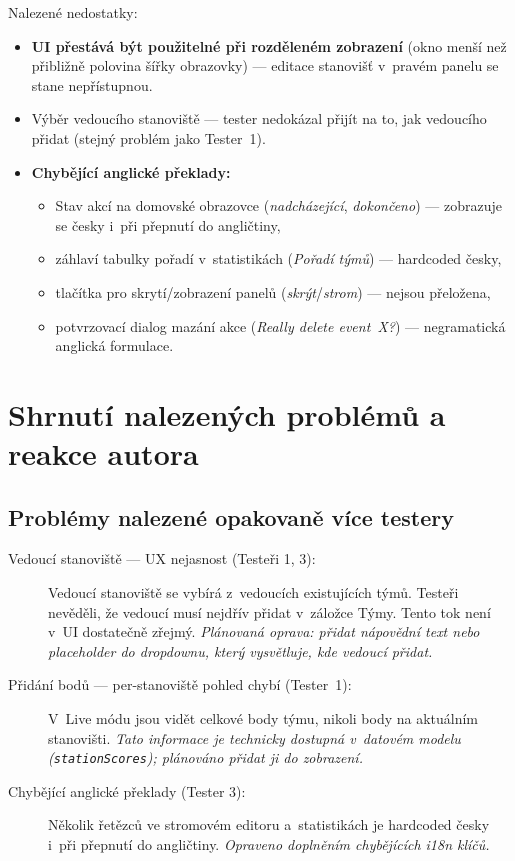 ﻿\documentclass[a4paper,12pt]{article}
\begin{document}
Nalezené nedostatky:

\begin{itemize}
  \item \textbf{UI přestává být použitelné při rozděleném zobrazení} (okno
    menší než přibližně polovina šířky obrazovky) — editace stanovišť
    v~pravém panelu se stane nepřístupnou.
  \item Výběr vedoucího stanoviště — tester nedokázal přijít na to, jak
    vedoucího přidat (stejný problém jako Tester~1).
  \item \textbf{Chybějící anglické překlady:}
    \begin{itemize}
      \item Stav akcí na domovské obrazovce (\emph{nadcházející},
        \emph{dokončeno}) — zobrazuje se česky i~při přepnutí do angličtiny,
      \item záhlaví tabulky pořadí v~statistikách (\emph{Pořadí týmů})
        — hardcoded česky,
      \item tlačítka pro skrytí/zobrazení panelů (\emph{skrýt}/\emph{strom})
        — nejsou přeložena,
      \item potvrzovací dialog mazání akce (\emph{Really delete event~X?})
        — negramatická anglická formulace.
    \end{itemize}
\end{itemize}

\section{Shrnutí nalezených problémů a reakce autora}

\subsection{Problémy nalezené opakovaně více testery}

\begin{description}
  \item[Vedoucí stanoviště — UX nejasnost (Testeři 1, 3):]
    Vedoucí stanoviště se vybírá z~vedoucích existujících týmů. Testeři
    nevěděli, že vedoucí musí nejdřív přidat v~záložce Týmy. Tento tok není
    v~UI dostatečně zřejmý. \textit{Plánovaná oprava: přidat nápovědní text
    nebo placeholder do dropdownu, který vysvětluje, kde vedoucí přidat.}

  \item[Přidání bodů — per-stanoviště pohled chybí (Tester~1):]
    V~Live módu jsou vidět celkové body týmu, nikoli body na aktuálním
    stanovišti. \textit{Tato informace je technicky dostupná v~datovém modelu
    (\texttt{stationScores}); plánováno přidat ji do zobrazení.}

  \item[Chybějící anglické překlady (Tester 3):]
    Několik řetězců ve stromovém editoru a~statistikách je hardcoded česky
    i~při přepnutí do angličtiny. \textit{Opraveno doplněním chybějících
    i18n klíčů.}
\end{description}
\end{document}
